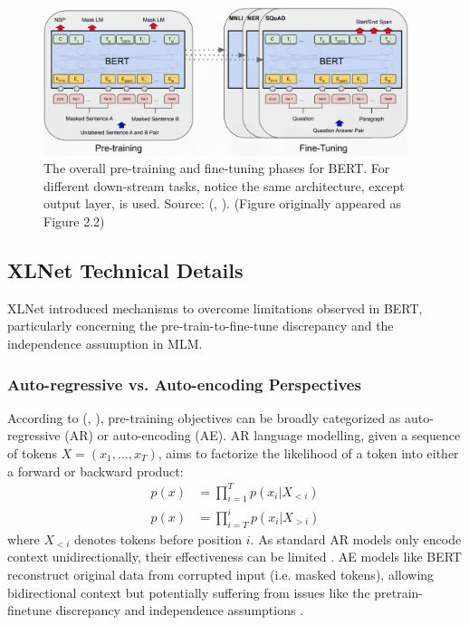 \documentclass[10pt,oneside]{report}
\renewcommand{\citet}[1]{\citeauthor{#1}, \citeyear{#1}}
\begin{document}
\begin{figure}[htbp]
    \centering
    \includegraphics[width=0.95\textwidth]{BERT1.png} 
    \caption[BERT Pre-training and Fine-tuning Phases (Appendix)]{The overall pre-training and fine-tuning phases for BERT. For different down-stream tasks, notice the same architecture, except output layer, is used. Source: (\citet{devlin2019bert}). (Figure originally appeared as Figure 2.2)}
    \label{fig:bert1_appendix} 
\end{figure}

\subsection{XLNet Technical Details}

XLNet \cite{yang2019xlnet} introduced mechanisms to overcome limitations observed in BERT, particularly concerning the pre-train-to-fine-tune discrepancy and the independence assumption in MLM.

\subsubsection*{Auto-regressive vs. Auto-encoding Perspectives}
According to (\citet{yang2019xlnet}), pre-training objectives can be broadly categorized as auto-regressive (AR) or auto-encoding (AE). AR language modelling, given a sequence of tokens $X = (x_1, ..., x_T)$, aims to factorize the likelihood of a token into either a forward or backward product:
\begin{align}
    p(x) &= \prod_{i=1}^{T} p(x_i | X_{<i}) \label{eq:fwdprod_appendix} \\
    p(x) &= \prod_{i=T}^{i} p(x_i | X_{>i}) \label{eq:bckprod_appendix}
\end{align}
where $X_{<i}$ denotes tokens before position $i$. As standard AR models only encode context unidirectionally, their effectiveness can be limited \cite{yang2019xlnet}. AE models like BERT reconstruct original data from corrupted input (i.e. masked tokens), allowing bidirectional context but potentially suffering from issues like the pretrain-finetune discrepancy and independence assumptions \cite{yang2019xlnet}.
\end{document}
